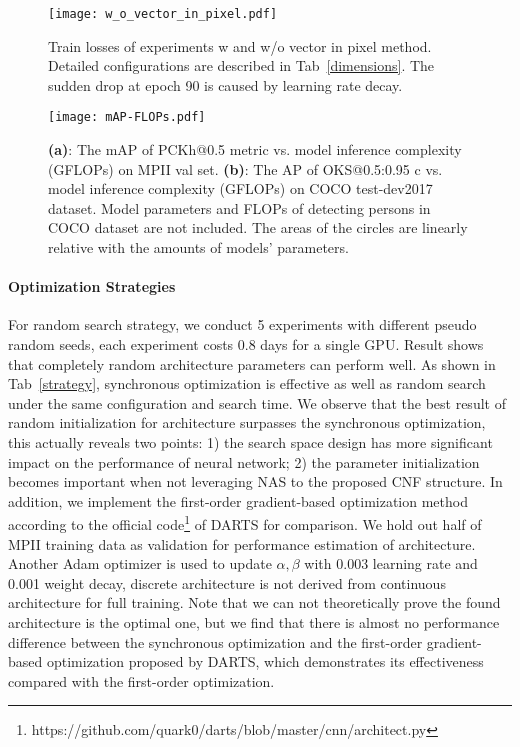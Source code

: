 \documentclass[journal]{IEEEtran}
\begin{document}
\begin{figure}
	
	\centering


	\texttt{[image: w\_o\_vector\_in\_pixel.pdf]}
	\caption{Train losses of experiments w and w/o vector in pixel method. Detailed configurations are described in Tab~\ref{dimensions}. The sudden drop at epoch 90 is caused by learning rate decay.}
	\centering
	\label{w_o_vector_in_pixel}
	
\end{figure}


\begin{figure*}[h]
	
	\centering
\texttt{[image: mAP-FLOPs.pdf]}
	\caption{\textbf{(a)}: The mAP of PCKh@0.5 metric vs. model inference complexity (GFLOPs) on MPII val set. \textbf{(b)}: The AP of OKS@0.5:0.95 c vs. model inference complexity (GFLOPs) on COCO test-dev2017 dataset. Model parameters and FLOPs of detecting persons in COCO dataset are not included. The areas of the circles are linearly relative with the amounts of models' parameters. }
	\centering
	\label{MAP-FLOPS}
	
\end{figure*}


\paragraph{Optimization Strategies} For random search strategy, we conduct 5 experiments with different pseudo random seeds, each experiment costs 0.8 days for a single GPU. Result shows that completely random architecture parameters can perform well. As shown in Tab~\ref{strategy}, synchronous optimization is effective as well as random search under the same configuration and search time. We observe that the best result of random initialization for architecture surpasses the synchronous optimization, this actually reveals two points: 1) the search space design has more significant impact on the performance of neural network; 2) the parameter initialization becomes important when not leveraging NAS to the proposed CNF structure. In addition, we implement the first-order gradient-based optimization method according to the official code\footnote{https://github.com/quark0/darts/blob/master/cnn/architect.py} of DARTS \cite{liu2018darts} for comparison. We hold out half of MPII training data as validation for performance estimation of architecture. Another Adam optimizer is used to update $\alpha, \beta$ with 0.003 learning rate and 0.001 weight decay, discrete architecture is not derived from continuous architecture for full training. Note that we can not theoretically prove the found architecture is the optimal one, but we find that there is almost no performance difference between the synchronous optimization and the first-order gradient-based optimization proposed by DARTS, which demonstrates its effectiveness compared with the first-order optimization.
\end{document}
